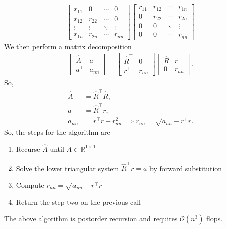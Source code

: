 \documentclass{report}
\begin{document}
\begin{itemize}
\begin{align*}
                \begin{bmatrix}
                    r_{11} & 0  & \cdots & 0\\
                    r_{12} & r_{22}  &  \cdots & 0 \\
                    \vdots & \vdots & \ddots & \vdots\\
                    r_{1n} & r_{2n} & \cdots & r_{nn}
                \end{bmatrix}
                \begin{bmatrix}
                    r_{11} & r_{12} & \cdots & r_{1n} \\
                    0 & r_{22} & \cdots & r_{2n} \\
                    0 & 0 & \ddots & \vdots \\
                    0 & 0  & \cdots & r_{nn}
                \end{bmatrix}
            \end{align*}
        We then perform a matrix decomposition 
        \begin{align*}
            \begin{bmatrix}
                \hat{A} & a \\
                a^{\top} & a_{nn}
            \end{bmatrix}
             =
             \begin{bmatrix}
                 \hat{R}^{\top} & 0 \\
                 r^{\top} & r_{nn}
             \end{bmatrix}
             \begin{bmatrix}
                 \hat{R} & r \\
                 0 & r_{nn}
             \end{bmatrix}
        .\end{align*}
        So, 
        \begin{align*}
            \hat{A} &= \hat{R}^{\top}\hat{R}, \\
            a &= \hat{R}^{\top}r, \\
            a_{nn} &= r^{\top}r + r_{nn}^{2} \implies r_{nn} = \sqrt{a_{nn} - r^{\top}r}
        .\end{align*}
        So, the steps for the algorithm are 
        \begin{enumerate}
            \item Recurse $\hat{A}$ until $A \in \mathbb{R}^{1\times 1}$
            \item Solve the lower triangular system $\hat{R}^{\top}r = a$ by forward substitution
            \item Compute $r_{nn} = \sqrt{a_{nn} - r^{\top}r} $
            \item Return the step two on the previous call
        \end{enumerate}
        The above algorithm is postorder recursion and requires $\mathcal{O}(n^{3})$ flops.



    \end{itemize}
\end{document}
